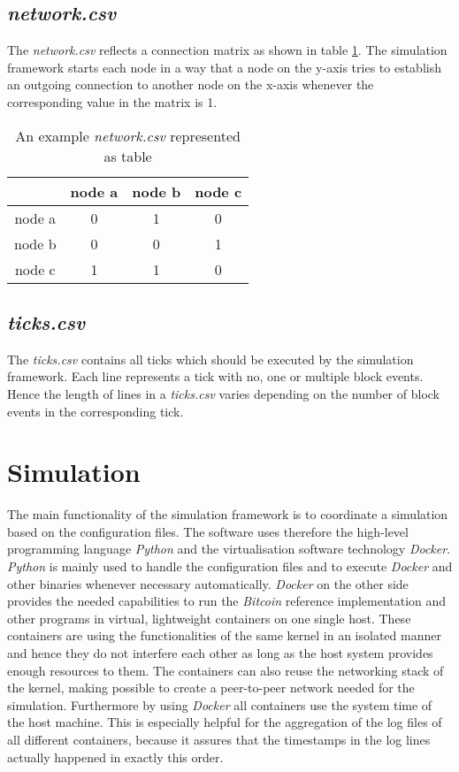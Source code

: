 \subsection{\textit{network.csv}}
The \textit{network.csv} reflects a connection matrix as shown in table \ref{tab:network_csv}.
The simulation framework starts each node in a way that a node on the y-axis tries to establish an outgoing connection to another node on the x-axis whenever the corresponding value in the matrix is 1.

\begin{table}
  \centering
  \begin{tabular}{c|ccc}
    			& node a 	& node b	& node c	\\
    \hline
    node a		& 0			& 1         & 0         \\
    node b      & 0         & 0         & 1			\\
    node c      & 1         & 1			& 0         \\
  \end{tabular}
  \caption{An example \textit{network.csv} represented as table}
  \label{tab:network_csv}
\end{table}

\subsection{\textit{ticks.csv}}

The \textit{ticks.csv} contains all ticks which should be executed by the simulation framework.
Each line represents a tick with no, one or multiple block events.
Hence the length of lines in a \textit{ticks.csv} varies depending on the number of block events in the corresponding tick.

\section{Simulation}
\label{chap:simulation}

The main functionality of the simulation framework is to coordinate a simulation based on the configuration files.
The software uses therefore the high-level programming language \textit{Python} and the virtualisation software technology \textit{Docker}.
\textit{Python} is mainly used to handle the configuration files and to execute \textit{Docker} and other binaries whenever necessary automatically.
\textit{Docker} on the other side provides the needed capabilities to run the \textit{Bitcoin} reference implementation and other programs in virtual, lightweight containers on one single host.
These containers are using the functionalities of the same kernel in an isolated manner and hence they do not interfere each other as long as the host system provides enough resources to them.
The containers can also reuse the networking stack of the kernel, making possible to create a peer-to-peer network needed for the simulation.
Furthermore by using \textit{Docker} all containers use the system time of the host machine.
This is especially helpful for the aggregation of the log files of all different containers, because it assures that the timestamps in the log lines actually happened in exactly this order.
	
